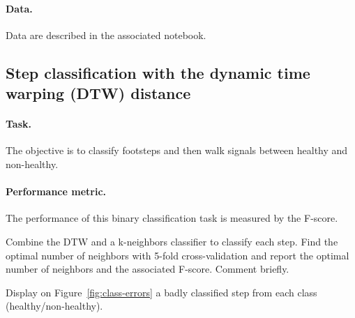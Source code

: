 \documentclass[11pt]{article}
\begin{document}
\paragraph{Data.}
Data are described in the associated notebook.

\subsection{Step classification with the dynamic time warping (DTW) distance}

\paragraph{Task.} The objective is to classify footsteps and then walk signals between healthy and non-healthy.

\paragraph{Performance metric.} The performance of this binary classification task is measured by the F-score.


\begin{exercise}
Combine the DTW and a k-neighbors classifier to classify each step. Find the optimal number of neighbors with 5-fold cross-validation and report the optimal number of neighbors and the associated F-score. Comment briefly.
\end{exercise}

\begin{solution}

\end{solution}

\newpage
\begin{exercise}\label{q:class-errors}
Display on Figure~\ref{fig:class-errors} a badly classified step from each class (healthy/non-healthy).
\end{exercise}

\end{document}
